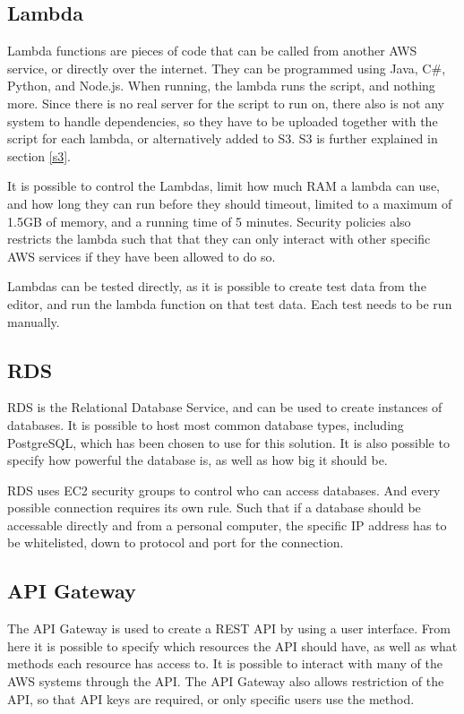 \subsection{Lambda}
Lambda functions are pieces of code that can be called from another AWS service, or directly over the internet. They can be programmed using Java, C\#, Python, and Node.js. When running, the lambda runs the script, and nothing more. Since there is no real server for the script to run on, there also is not any system to handle dependencies, so they have to be uploaded together with the script for each lambda, or alternatively added to S3. S3 is further explained in section \ref{s3}.

It is possible to control the Lambdas, limit how much RAM a lambda can use, and how long they can run before they should timeout, limited to a maximum of 1.5GB of memory, and a running time of 5 minutes. Security policies also restricts the lambda such that that they can only interact with other specific AWS services if they have been allowed to do so.

Lambdas can be tested directly, as it is possible to create test data from the editor, and run the lambda function on that test data. Each test needs to be run manually.

\subsection{RDS}
RDS is the Relational Database Service, and can be used to create instances of databases. It is possible to host most common database types, including PostgreSQL, which has been chosen to use for this solution. It is also possible to specify how powerful the database is, as well as how big it should be.

RDS uses EC2 security groups to control who can access databases. And every possible connection requires its own rule. Such that if a database should be accessable directly and from a personal computer, the specific IP address has to be whitelisted, down to protocol and port for the connection.

\subsection{API Gateway}
The API Gateway is used to create a REST API by using a user interface. From here it is possible to specify which resources the API should have, as well as what methods each resource has access to. It is possible to interact with many of the AWS systems through the API. The API Gateway also allows restriction of the API, so that API keys are required, or only specific users use the method.

